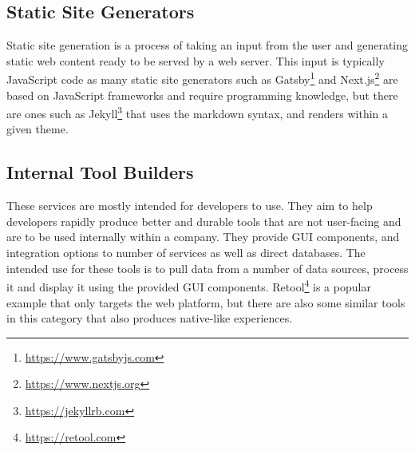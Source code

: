 \subsection{Static Site Generators}

Static site generation is a process of taking an input from the user and generating static web content ready to be served by a web server. This input is typically JavaScript code as many static site generators such as Gatsby\footnote{\url{https://www.gatsbyjs.com}} and Next.js\footnote{\url{https://www.nextjs.org}} are based on JavaScript frameworks and require programming knowledge, but there are ones such as Jekyll\footnote{\url{https://jekyllrb.com}} that uses the markdown syntax, and renders within a given theme.

\subsection{Internal Tool Builders}

These services are mostly intended for developers to use. They aim to help developers rapidly produce better and durable tools that are not user-facing and are to be used internally within a company. They provide GUI components, and integration options to number of services as well as direct databases. The intended use for these tools is to pull data from a number of data sources, process it and display it using the provided GUI components. Retool\footnote{\url{https://retool.com}} is a popular example that only targets the web platform, but there are also some similar tools in this category that also produces native-like experiences.
